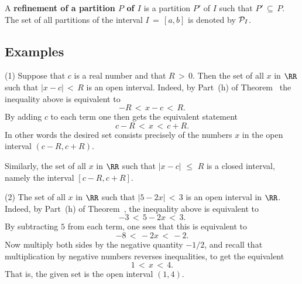         A {\bf refinement of a partition $P$ of $I$}
    is a partition $P'$ of $I$ such that $P' \,{\subseteq}\, P$.
        The set of all partitions of the interval $I \,=\, [a,b]$ is denoted by ${\cal P}_{I}$.



\V
\V

            \subsection{\small{\bf Examples}}
            \label{ExampB20.135}

\V

\hspace*{\parindent}(1) Suppose that $c$ is a real number and that $R\,>\,0$. Then the set of all $x$ in ${\RR}$ such that $|x-c|\,<\,R$ is an open interval.
    Indeed, by Part~(h) of Theorem~ the inequality above is equivalent to
        \begin{displaymath}
        -R\,<\,x-c\,<\,R.
        \end{displaymath}
    By adding $c$ to each term one then gets the equivalent statement
        \begin{displaymath}
        c-R\,<\,x\,<\,c+R.
        \end{displaymath}
    In other words the desired set consists precisely of the numbers $x$ in the open interval $(c-R,c+R)$.

        Similarly, the set of all $x$ in ${\RR}$ such that $|x-c|\,\,{\leq}\,\,R$ is a closed interval, namely the interval $[c-R,c+R]$.


\V

        (2) The set of all $x$ in ${\RR}$ such that $|5-2x|\,<\,3$ is an open interval in ${\RR}$.
    Indeed, by Part~(h) of Theorem~, the inequality above is equivalent to
        \begin{displaymath}
        -3\,<\,5-2x\,<\,3.
        \end{displaymath}
    By subtracting $5$ from each term, one sees that this is equivalent to
        \begin{displaymath}
        -8\,<\,-2x\,<\,-2.
        \end{displaymath}
    Now multiply both sides by the negative quantity $-1/2$, and recall that multiplication by negative numbers reverses inequalities, to get the equivalent
        \begin{displaymath}
        1\,<\,x\,<\,4.
        \end{displaymath}
    That is, the given set is the open interval $(1,4)$.


